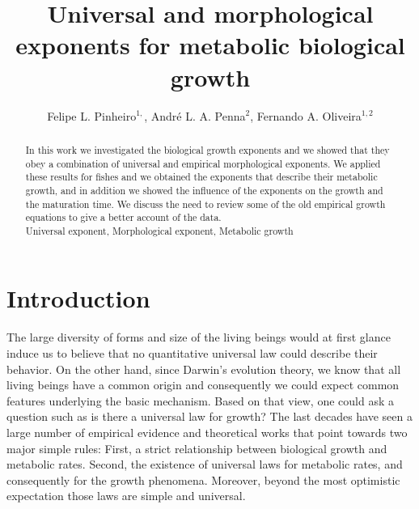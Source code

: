 \documentclass[10pt]{iopart}
\begin{document}
\title{Universal and morphological exponents for metabolic biological growth}
	\author{Felipe L. Pinheiro$^{1,}$, Andr\'{e} L. A. Penna$^2$, Fernando A. Oliveira$^{1,2}$}
	\address{
	$^1$ Instituto de Física, Universidade de Brasília, Brazil
}
	\address{
	$^2$ International Center for Condensed Matter Physics, Universidade de Bras\'{i}lia, Brazil
}



\begin{abstract}
In this work we investigated the biological growth exponents and we showed that they obey a combination of universal and empirical morphological exponents.  We applied these results for fishes and we obtained the exponents that describe their metabolic growth, and in addition we showed the influence of the exponents on the growth and the maturation time. We discuss the need to review some of the old empirical growth equations to give a better account of the data.\\
 Universal exponent, Morphological exponent, Metabolic growth
\end{abstract}

\ioptwocol

\section{Introduction}
\label{intro}
The large diversity of forms and size of the living beings would at first glance induce us to believe that  no quantitative universal law could describe their behavior.  On the other  hand, since Darwin's evolution theory, we know that all living beings have a common origin and consequently we could expect common features underlying the basic mechanism. Based on that view, one could ask a question such as is there a universal law for growth? The last decades have seen a large number of  empirical evidence  and theoretical works that point towards two major simple rules:  First, a strict relationship between biological growth and  metabolic rates. Second, the existence of universal laws for metabolic rates, and consequently for the growth phenomena. Moreover, beyond the most optimistic expectation those laws are simple and universal.
\end{document}
